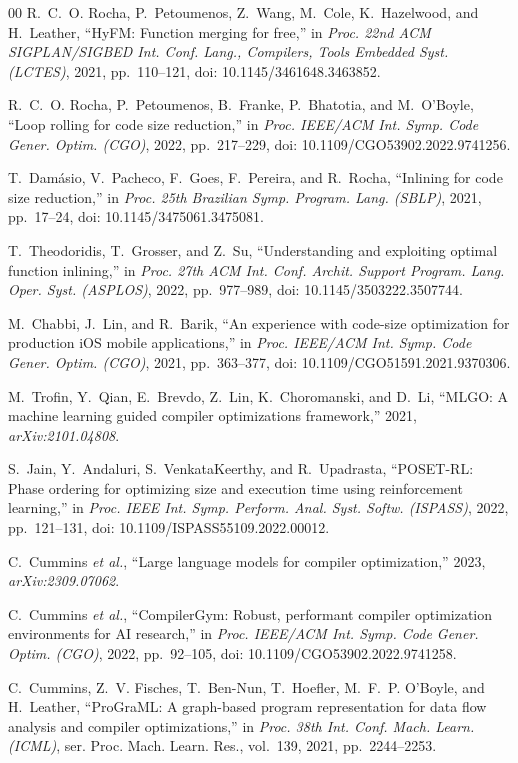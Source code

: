 \documentclass{ieeeaccess}
\begin{document}
\begin{thebibliography}{00}
R.~C.~O. Rocha, P.~Petoumenos, Z.~Wang, M.~Cole, K.~Hazelwood, and H.~Leather, ``HyFM: Function merging for free,'' in \emph{Proc. 22nd ACM SIGPLAN/SIGBED Int. Conf. Lang., Compilers, Tools Embedded Syst. (LCTES)}, 2021, pp.~110--121, doi: 10.1145/3461648.3463852.

R.~C.~O. Rocha, P.~Petoumenos, B.~Franke, P.~Bhatotia, and M.~O'Boyle, ``Loop rolling for code size reduction,'' in \emph{Proc. IEEE/ACM Int. Symp. Code Gener. Optim. (CGO)}, 2022, pp.~217--229, doi: 10.1109/CGO53902.2022.9741256.

T.~Dam\'asio, V.~Pacheco, F.~Goes, F.~Pereira, and R.~Rocha, ``Inlining for code size reduction,'' in \emph{Proc. 25th Brazilian Symp. Program. Lang. (SBLP)}, 2021, pp.~17--24, doi: 10.1145/3475061.3475081.

T.~Theodoridis, T.~Grosser, and Z.~Su, ``Understanding and exploiting optimal function inlining,'' in \emph{Proc. 27th ACM Int. Conf. Archit. Support Program. Lang. Oper. Syst. (ASPLOS)}, 2022, pp.~977--989, doi: 10.1145/3503222.3507744.

M.~Chabbi, J.~Lin, and R.~Barik, ``An experience with code-size optimization for production iOS mobile applications,'' in \emph{Proc. IEEE/ACM Int. Symp. Code Gener. Optim. (CGO)}, 2021, pp.~363--377, doi: 10.1109/CGO51591.2021.9370306.

M.~Trofin, Y.~Qian, E.~Brevdo, Z.~Lin, K.~Choromanski, and D.~Li, ``MLGO: A machine learning guided compiler optimizations framework,'' 2021, \emph{arXiv:2101.04808}.

S.~Jain, Y.~Andaluri, S.~VenkataKeerthy, and R.~Upadrasta, ``POSET-RL: Phase ordering for optimizing size and execution time using reinforcement learning,'' in \emph{Proc. IEEE Int. Symp. Perform. Anal. Syst. Softw. (ISPASS)}, 2022, pp.~121--131, doi: 10.1109/ISPASS55109.2022.00012.

C.~Cummins \emph{et al.}, ``Large language models for compiler optimization,'' 2023, \emph{arXiv:2309.07062}.

C.~Cummins \emph{et al.}, ``CompilerGym: Robust, performant compiler optimization environments for AI research,'' in \emph{Proc. IEEE/ACM Int. Symp. Code Gener. Optim. (CGO)}, 2022, pp.~92--105, doi: 10.1109/CGO53902.2022.9741258.

C.~Cummins, Z.~V. Fisches, T.~Ben-Nun, T.~Hoefler, M.~F.~P. O'Boyle, and H.~Leather, ``ProGraML: A graph-based program representation for data flow analysis and compiler optimizations,'' in \emph{Proc. 38th Int. Conf. Mach. Learn. (ICML)}, ser. Proc. Mach. Learn. Res., vol.~139, 2021, pp.~2244--2253.


\end{thebibliography}
\end{document}
